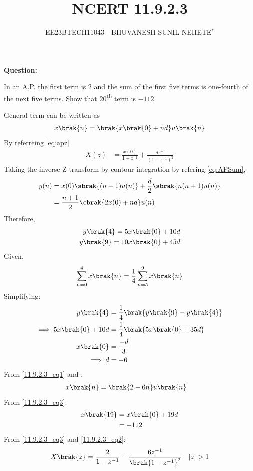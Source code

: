 \documentclass[journal,12pt,twocolumn]{IEEEtran}
\theoremstyle{remark}
\begin{document}

\vspace{3cm}

\title{NCERT 11.9.2.3}
\author{EE23BTECH11043 - BHUVANESH SUNIL NEHETE$^{*}$%
}
\maketitle
\newpage
\bigskip

\renewcommand{\thefigure}{\theenumi}
\renewcommand{\thetable}{\theenumi}



\textbf{Question:}

In an A.P. the first term is 2 and the sum of the first five terms is one-fourth of the next five terms. Show  that 20\textsuperscript{th} term is $-112$.

\solution
\fi


General term can be written as
\begin{align}
    x\brak{n} = \brak{x\brak{0} + nd}u\brak{n}
\end{align}
By referreing \eqref{eq:apz}
\begin{align}
    X(z) &= \frac{x(0)}{1-z^{-1}} + \frac{dz^{-1}}{(1-z^{-1})^{2}}\label{11.9.2.3_eq2}
\end{align}
Taking the inverse Z-transform by contour integration by refering \eqref{eq:APSum},
\begin{align}
    y(n) &= x(0)\sbrak{(n + 1)u(n)} + \frac{d}{2}\sbrak{n(n + 1)u(n)}\\
    &= \frac{n+1}{2}\cbrak{2x(0) + nd}u(n)
\end{align}
Therefore, 
\begin{align}
    y\brak{4}=5x\brak{0}+10d\\
    y\brak{9}=10x\brak{0}+45d
\end{align}
Given, 
   \begin{align}
       \sum_{n=0}^{4}x\brak{n} = \frac{1}{4}\sum_{n=5}^{9}x\brak{n}
   \end{align}
Simplifying:
    \begin{align}
        y\brak{4} &= \frac{1}{4}\brak{y\brak{9}-y\brak{4}}\\
        \implies 5x\brak{0} + 10d &= \frac{1}{4}\brak{5x\brak{0} + 35d}\\
        x\brak{0} &= \frac{-d}{3}\\
        \implies d &= -6 \label{11.9.2.3_eq1}
    \end{align}
From \eqref{11.9.2.3_eq1} and :
    \begin{align}
        x\brak{n}&=\brak{2-6n}u\brak{n} \label{11.9.2.3_eq3}
   \end{align} 
From \eqref{11.9.2.3_eq3}:
    \begin{align}
        x\brak{19}&=x\brak{0}+19d\\ 
        &= -112
    \end{align}    
From \eqref{11.9.2.3_eq3} and \eqref{11.9.2.3_eq2}:
    \begin{align}
        X\brak{z}=\frac{2}{1-z^{-1}} - \frac{6z^{-1}}{\brak{1-z^{-1}}^{2}} \quad |z|>1
    \end{align}
\end{document}
